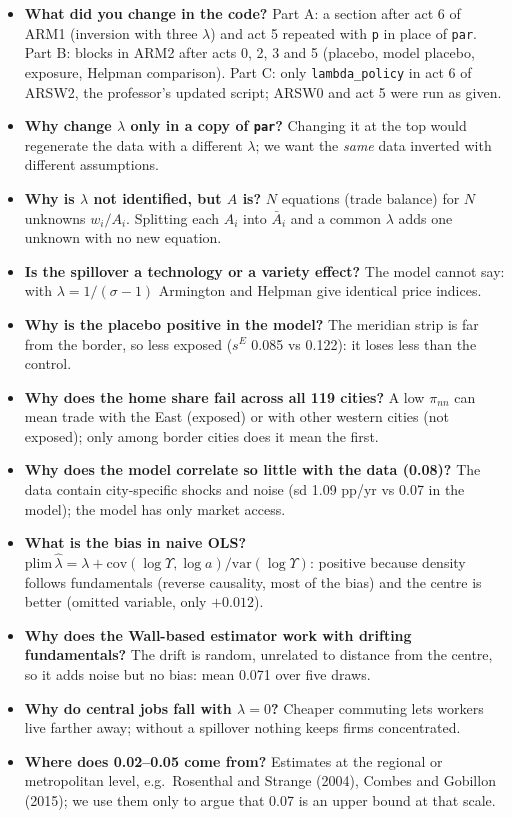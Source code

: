 \documentclass[11pt,a4paper]{article}
\begin{document}
\begin{ask}
\begin{itemize}[leftmargin=12pt,itemsep=4pt,topsep=2pt]
\item \textbf{What did you change in the code?} Part A: a section after act 6 of ARM1 (inversion with three $\lambda$) and act 5 repeated with \texttt{p} in place of \texttt{par}. Part B: blocks in ARM2 after acts 0, 2, 3 and 5 (placebo, model placebo, exposure, Helpman comparison). Part C: only \texttt{lambda\_policy} in act 6 of ARSW2, the professor's updated script; ARSW0 and act 5 were run as given.
\item \textbf{Why change $\lambda$ only in a copy of \texttt{par}?} Changing it at the top would regenerate the data with a different $\lambda$; we want the \emph{same} data inverted with different assumptions.
\item \textbf{Why is $\lambda$ not identified, but $A$ is?} $N$ equations (trade balance) for $N$ unknowns $w_i/A_i$. Splitting each $A_i$ into $\bar A_i$ and a common $\lambda$ adds one unknown with no new equation.
\item \textbf{Is the spillover a technology or a variety effect?} The model cannot say: with $\lambda = 1/(\sigma-1)$ Armington and Helpman give identical price indices.
\item \textbf{Why is the placebo positive in the model?} The meridian strip is far from the border, so less exposed ($s^E$ 0.085 vs 0.122): it loses less than the control.
\item \textbf{Why does the home share fail across all 119 cities?} A low $\pi_{nn}$ can mean trade with the East (exposed) or with other western cities (not exposed); only among border cities does it mean the first.
\item \textbf{Why does the model correlate so little with the data (0.08)?} The data contain city-specific shocks and noise (sd 1.09 pp/yr vs 0.07 in the model); the model has only market access.
\item \textbf{What is the bias in naive OLS?} $\mathrm{plim}\,\hat\lambda = \lambda + \mathrm{cov}(\log\Upsilon,\log a)/\mathrm{var}(\log\Upsilon)$: positive because density follows fundamentals (reverse causality, most of the bias) and the centre is better (omitted variable, only $+0.012$).
\item \textbf{Why does the Wall-based estimator work with drifting fundamentals?} The drift is random, unrelated to distance from the centre, so it adds noise but no bias: mean 0.071 over five draws.
\item \textbf{Why do central jobs fall with $\lambda = 0$?} Cheaper commuting lets workers live farther away; without a spillover nothing keeps firms concentrated.
\item \textbf{Where does 0.02--0.05 come from?} Estimates at the regional or metropolitan level, e.g.\ Rosenthal and Strange (2004), Combes and Gobillon (2015); we use them only to argue that 0.07 is an upper bound at that scale.
\end{itemize}
\end{ask}
\end{document}
